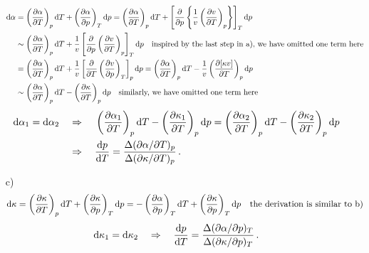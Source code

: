 \documentclass[letterpaper, 10pt]{article}
\begin{document}
\begin{itemize}
\begin{align*}
	{\rm{d}\alpha} & = \left(\frac{\partial{\alpha}}{\partial{T}}\right)_{p}{\rm{d}}T + \left(\frac{\partial{\alpha}}{\partial{p}}\right)_{T}{\rm{d}}p = \left(\frac{\partial{\alpha}}{\partial{T}}\right)_{p}{\rm{d}}T + \left[\frac{\partial}{\partial{p}}\left\{\frac{1}{v}\left(\frac{\partial{v}}{\partial{T}}\right)_{p}\right\}\right]_{T}{\rm{d}}p \\ & \sim \left(\frac{\partial{\alpha}}{\partial{T}}\right)_{p}{\rm{d}}T + \frac{1}{v} \left[\frac{\partial}{\partial{p}}\left(\frac{\partial{v}}{\partial{T}}\right)_{p}\right]_{T}{\rm{d}}p \quad{} \text{inspired by the last step in a), we have omitted one term here} \\ & = \left(\frac{\partial{\alpha}}{\partial{T}}\right)_{p}{\rm{d}}T + \frac{1}{v} \left[\frac{\partial}{\partial{T}}\left(\frac{\partial{v}}{\partial{p}}\right)_{T}\right]_{p}{\rm{d}}p = \left(\frac{\partial{\alpha}}{\partial{T}}\right)_{p}{\rm{d}}T - \frac{1}{v} \left(\frac{\partial{[\kappa{v}]}}{\partial{T}}\right)_{p}{\rm{d}}p \\ & \sim \left(\frac{\partial{\alpha}}{\partial{T}}\right)_{p}{\rm{d}}T - \left(\frac{\partial{\kappa}}{\partial{T}}\right)_{p}{\rm{d}}p \quad{} \text{similarly, we have omitted one term here}
	\end{align*}
	\begin{align*}
	{\rm{d}}\alpha_{1}={\rm{d}}\alpha_{2} \quad{}&\Rightarrow\quad{} \left(\frac{\partial{\alpha_{1}}}{\partial{T}}\right)_{p}{\rm{d}}T - \left(\frac{\partial{\kappa_{1}}}{\partial{T}}\right)_{p}{\rm{d}}p = \left(\frac{\partial{\alpha_{2}}}{\partial{T}}\right)_{p}{\rm{d}}T - \left(\frac{\partial{\kappa_{2}}}{\partial{T}}\right)_{p}{\rm{d}}p \\ &\Rightarrow\quad{} \frac{{\rm{d}}p}{{\rm{d}}T}=\frac{\Delta(\partial{\alpha}/\partial{T})_{p}}{\Delta(\partial{\kappa}/\partial{T})_{p}}\,.
	\end{align*}
	\item[c)]
	\begin{align*}
	{\rm{d}}\kappa=\left(\frac{\partial{\kappa}}{\partial{T}}\right)_{p}{\rm{d}}T + \left(\frac{\partial{\kappa}}{\partial{p}}\right)_{T}{\rm{d}}p = -\left(\frac{\partial{\alpha}}{\partial{p}}\right)_{T}{\rm{d}}T + \left(\frac{\partial{\kappa}}{\partial{p}}\right)_{T}{\rm{d}}p \quad{} \text{the derivation is similar to b)}
	\end{align*}
	\begin{align*}
	{\rm{d}}\kappa_{1}={\rm{d}}\kappa_{2} \quad{}\Rightarrow\quad{} \frac{{\rm{d}}p}{{\rm{d}}T}=\frac{\Delta(\partial{\alpha}/\partial{p})_{T}}{\Delta(\partial{\kappa}/\partial{p})_{T}}\,.
	\end{align*}
	
\end{itemize}
\end{document}

